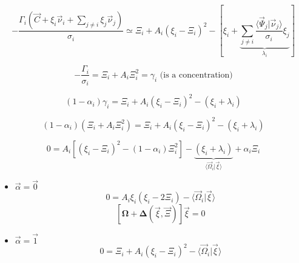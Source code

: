 \documentclass[aps,12pt]{revtex4}
\begin{document}
\begin{equation}
	-\dfrac{\Gamma_i\left(\vec{C}+\xi_i \vec{\nu}_i  + \sum_{j\not= i} \xi_j \vec{\nu}_j \right) }{\sigma_i}  \simeq
	 \Xi_i + A_i \left(\xi_i - \Xi_i\right)^2 - \left[ \xi_i + \underbrace{\sum_{j\not=i}  \dfrac{\langle \vec{\Psi}_j \vert \vec{\nu}_j \rangle}{\sigma_i} \xi_j}_{\lambda_i} \right]
\end{equation}

\begin{equation}
		-\dfrac{\Gamma_i}{\sigma_i} = \Xi_i + A_i \Xi_i^2 = \gamma_i \text{ (is a concentration)}
\end{equation}

\begin{equation}
	(1-\alpha_i) \gamma_i = \Xi_i + A_i \left(\xi_i - \Xi_i\right)^2 - (\xi_i+\lambda_i)
\end{equation}

\begin{equation}
	(1-\alpha_i) (\Xi_i+A_i\Xi_i^2) = \Xi_i + A_i \left(\xi_i - \Xi_i\right)^2 - (\xi_i+\lambda_i)
\end{equation}

\begin{equation}
	0  =  A_i \left[ \left(\xi_i - \Xi_i\right)^2 - (1-\alpha_i) \Xi_i^2\right] - \underbrace{(\xi_i+\lambda_i)}_{\langle \vec{\Omega}_i\vert \vec{\xi} \rangle} + \alpha_i \Xi_i 
\end{equation}

\begin{itemize}
\item	$\vec{\alpha}=\vec{0}$
	\begin{equation}
	0 = A_i \xi_i (\xi_i-2\Xi_i) - \langle \vec{\Omega}_i\vert \vec{\xi} \rangle
	\end{equation}
	\begin{equation}
	\left[\bm{\Omega} + \bm{\Delta}(\vec{\xi},\vec{\Xi})\right] \vec{\xi} = 0
	\end{equation}
	
\item	$\vec{\alpha}=\vec{1}$
	\begin{equation}
	0=\Xi_i + A_i(\xi_i-\Xi_i)^2 - \langle \vec{\Omega}_i\vert \vec{\xi} \rangle
	\end{equation}
\end{itemize}
\end{document}
